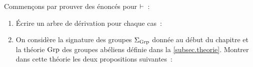 \begin{exercise}
  Commençons par prouver des énoncés pour $\vdash$~:
  \begin{enumerate}[label=(\roman*)]
  \item \'Ecrire un arbre de dérivation pour chaque cas~:

    \vspace{5pt}
  \item On considère la signature des groupes $\Sigma_{\operatorname{Grp}}$
    donnée au début du chapitre
    et la théorie $\operatorname{Grp}$ des groupes abéliens définie dans la
    \cref{subsec.theorie}.
    Montrer dans cette théorie les deux propositions suivantes~:
  \end{enumerate}
\end{exercise}

